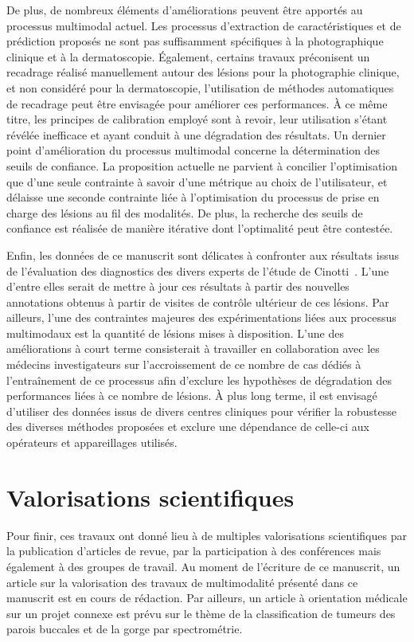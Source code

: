 De plus, de nombreux éléments d'améliorations peuvent être apportés au processus multimodal actuel. Les processus d'extraction de caractéristiques et de prédiction proposés ne sont pas suffisamment spécifiques à la photographique clinique et à la dermatoscopie. Également, certains travaux préconisent un recadrage réalisé manuellement autour des lésions pour la photographie clinique, et non considéré pour la dermatoscopie, l'utilisation de méthodes automatiques de recadrage peut être envisagée pour améliorer ces performances. À ce même titre, les principes de calibration employé sont à revoir, leur utilisation s'étant révélée inefficace et ayant conduit à une dégradation des résultats. Un dernier point d'amélioration du processus multimodal concerne la détermination des seuils de confiance. La proposition actuelle ne parvient à concilier l'optimisation que d'une seule contrainte à savoir d'une métrique au choix de l'utilisateur, et délaisse une seconde contrainte liée à l'optimisation du processus de prise en charge des lésions au fil des modalités. De plus, la recherche des seuils de confiance est réalisée de manière itérative dont l'optimalité peut être contestée.\par

Enfin, les données de ce manuscrit sont délicates à confronter aux résultats issus de l'évaluation des diagnostics des divers experts de l'étude de Cinotti~. L'une d'entre elles serait de mettre à jour ces résultats à partir des nouvelles annotations obtenus à partir de visites de contrôle ultérieur de ces lésions. Par ailleurs, l'une des contraintes majeures des expérimentations liées aux processus multimodaux est la quantité de lésions mises à disposition. L'une des améliorations à court terme consisterait à travailler en collaboration avec les médecins investigateurs sur l'accroissement de ce nombre de cas dédiés à l'entraînement de ce processus afin d'exclure les hypothèses de dégradation des performances liées à ce nombre de lésions. À plus long terme, il est envisagé d'utiliser des données issus de divers centres cliniques pour vérifier la robustesse des diverses méthodes proposées et exclure une dépendance de celle-ci aux opérateurs et appareillages utilisés.\par

\clearpage

\section*{Valorisations scientifiques}
Pour finir, ces travaux ont donné lieu à de multiples valorisations scientifiques par la publication d'articles de revue, par la participation à des conférences mais également à des groupes de travail. Au moment de l'écriture de ce manuscrit, un article sur la valorisation des travaux de multimodalité présenté dans ce manuscrit est en cours de rédaction. Par ailleurs, un article à orientation médicale sur un projet connexe est prévu sur le thème de la classification de tumeurs des parois buccales et de la gorge par spectrométrie.\par

